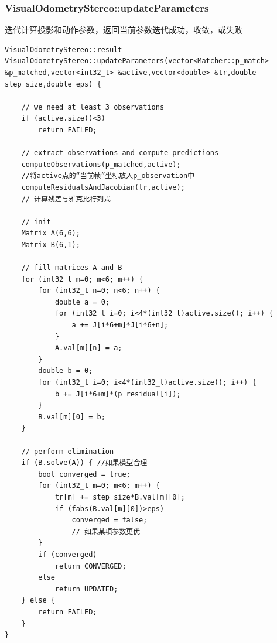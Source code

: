 \documentclass[UTF8]{ctexart}
\begin{document}
    \subsubsection{VisualOdometryStereo::updateParameters}
    迭代计算投影和动作参数，返回当前参数迭代成功，收敛，或失败
    \begin{verbatim}
VisualOdometryStereo::result VisualOdometryStereo::updateParameters(vector<Matcher::p_match> &p_matched,vector<int32_t> &active,vector<double> &tr,double step_size,double eps) {
    
    // we need at least 3 observations
    if (active.size()<3)
        return FAILED;
    
    // extract observations and compute predictions
    computeObservations(p_matched,active); 
    //将active点的“当前帧”坐标放入p_observation中
    computeResidualsAndJacobian(tr,active); 
    // 计算残差与雅克比行列式

    // init
    Matrix A(6,6);
    Matrix B(6,1);

    // fill matrices A and B
    for (int32_t m=0; m<6; m++) {
        for (int32_t n=0; n<6; n++) {
            double a = 0;
            for (int32_t i=0; i<4*(int32_t)active.size(); i++) {
                a += J[i*6+m]*J[i*6+n];
            }
            A.val[m][n] = a;
        }
        double b = 0;
        for (int32_t i=0; i<4*(int32_t)active.size(); i++) {
            b += J[i*6+m]*(p_residual[i]);
        }
        B.val[m][0] = b;
    }

    // perform elimination
    if (B.solve(A)) { //如果模型合理
        bool converged = true;
        for (int32_t m=0; m<6; m++) {
            tr[m] += step_size*B.val[m][0];
            if (fabs(B.val[m][0])>eps)
                converged = false;
                // 如果某项参数更优
        }
        if (converged)
            return CONVERGED;
        else
            return UPDATED;
    } else {
        return FAILED;
    }
}
    \end{verbatim}
\end{document}
